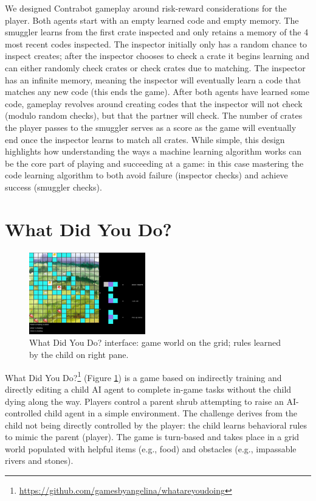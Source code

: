 \documentclass{sig-alternate}
\begin{document}
We designed {\sc Contrabot} gameplay around risk-reward considerations for the player.
Both agents start with an empty learned code and empty memory. 
The smuggler learns from the first crate inspected and only retains a memory of the 4 most recent codes inspected. 
The inspector initially only has a random chance to inspect creates; after the inspector chooses to check a crate it begins learning and can either randomly check crates or check crates due to matching.
The inspector has an infinite memory, meaning the inspector will eventually learn a code that matches any new code (this ends the game).
After both agents have learned some code, gameplay revolves around creating codes that the inspector will not check (modulo random checks), but that the partner will check.
The number of crates the player passes to the smuggler serves as a score as the game will eventually end once the inspector learns to match all crates.
While simple, this design highlights how understanding the ways a machine learning algorithm works can be the core part of playing and succeeding at a game: in this case mastering the code learning algorithm to both avoid failure (inspector checks) and achieve success (smuggler checks).


\section{What Did You Do?}
\begin{figure}[tb]
\centering
\includegraphics[width=0.45\textwidth]{images/WDYD}
\caption{{\sc What Did You Do?} interface: game world on the grid; rules learned by the child on right pane.}
\label{fig:WDYD}
\end{figure}

{\sc What Did You Do?}\footnote{\url{https://github.com/gamesbyangelina/whatareyoudoing}} (Figure \ref{fig:WDYD}) is a game based on indirectly training and directly editing a child AI agent to complete in-game tasks without the child dying along the way.
Players control a parent shrub attempting to raise an AI-controlled child agent in a simple environment.
The challenge derives from the child not being directly controlled by the player: the child learns behavioral rules to mimic the parent (player).
The game is turn-based and takes place in a grid world populated with helpful items (e.g., food) and obstacles (e.g., impassable rivers and stones).
\end{document}
